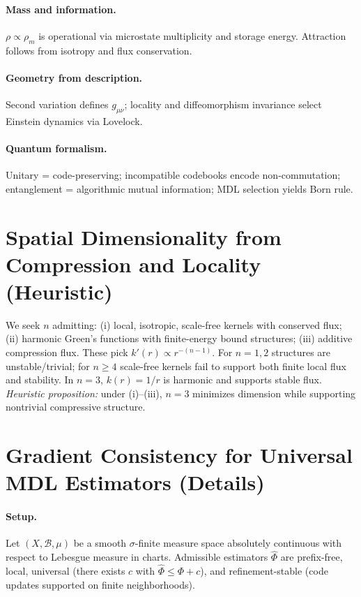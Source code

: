 \documentclass[aps,preprint,onecolumn,longbibliography,nofootinbib]{revtex4-2}
\numberwithin{equation}{section}
\begin{document}
\paragraph*{Mass and information.} $\rho\propto\rho_m$ is operational via microstate multiplicity and storage energy. Attraction follows from isotropy and flux conservation.

\paragraph*{Geometry from description.} Second variation defines $g_{\mu\nu}$; locality and diffeomorphism invariance select Einstein dynamics via Lovelock.

\paragraph*{Quantum formalism.} Unitary = code-preserving; incompatible codebooks encode non-commutation; entanglement = algorithmic mutual information; MDL selection yields Born rule.

\section{Spatial Dimensionality from Compression and Locality (Heuristic)}\label{app:F}
We seek $n$ admitting: (i) local, isotropic, scale-free kernels with conserved flux; (ii) harmonic Green’s functions with finite-energy bound structures; (iii) additive compression flux. These pick $k'(r)\propto r^{-(n-1)}$. For $n=1,2$ structures are unstable/trivial; for $n\ge4$ scale-free kernels fail to support both finite local flux and stability. In $n=3$, $k(r)=1/r$ is harmonic and supports stable flux. \emph{Heuristic proposition:} under (i)--(iii), $n=3$ minimizes dimension while supporting nontrivial compressive structure.

\section{Gradient Consistency for Universal MDL Estimators (Details)}\label{app:G}
\paragraph*{Setup.} Let $(X,\mathcal{B},\mu)$ be a smooth $\sigma$-finite measure space absolutely continuous with respect to Lebesgue measure in charts. Admissible estimators $\widehat\Phi$ are prefix-free, local, universal (there exists $c$ with $\widehat\Phi\le\Phi+c$), and refinement-stable (code updates supported on finite neighborhoods).
\end{document}
